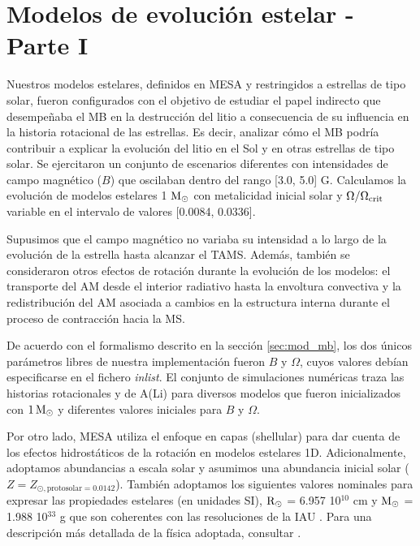 \section{Modelos de evolución estelar - Parte I} \label{evo_estelar_i}
Nuestros modelos estelares, definidos en MESA y restringidos a estrellas de tipo solar, fueron configurados con el objetivo de estudiar el papel indirecto que desempeñaba el MB en la destrucción del litio a consecuencia de su influencia en la historia rotacional de las estrellas. Es decir, analizar cómo el MB podría contribuir a explicar la evolución del litio en el Sol y en otras estrellas de tipo solar. Se ejercitaron un conjunto de escenarios diferentes con intensidades de campo magnético ($B$) que oscilaban dentro del rango [3.0, 5.0] G. Calculamos la evolución de modelos estelares  1 $\mathrm{M}_\odot$ con metalicidad inicial solar y $\Omega / \Omega_{\mathrm{crit}}$ variable en el intervalo de valores [0.0084, 0.0336].\par

Supusimos que el campo magnético no variaba su intensidad a lo largo de la evolución de la estrella hasta alcanzar el TAMS. Además, también se consideraron otros efectos de rotación durante la evolución de los modelos: el transporte del AM desde el interior radiativo hasta la envoltura convectiva y la redistribución del AM asociada a cambios en la estructura interna durante el proceso de contracción hacia la MS.\par

De acuerdo con el formalismo descrito en la sección \ref{sec:mod_mb}, los dos únicos parámetros libres de nuestra implementación fueron $B$ y $\Omega$, cuyos valores debían especificarse en el fichero \textit{inlist}. El conjunto de simulaciones numéricas traza las historias rotacionales y de A(Li) para diversos modelos que fueron inicializados con $1 \, \mathrm{M}_\odot$ y diferentes valores iniciales para $B$ y $\Omega$.\par 

Por otro lado, MESA utiliza el enfoque en capas (shellular) \citep{Meynet1997} para dar cuenta de los efectos hidrostáticos de la rotación en modelos estelares 1D. Adicionalmente, adoptamos abundancias a escala solar y asumimos una abundancia inicial solar ($Z = Z_{\odot, \mathrm{protosolar} = 0.0142}$). También adoptamos los siguientes valores nominales para expresar las propiedades estelares (en unidades SI), $\mathrm{R}_\odot$ = 6.957 10$^{10}$ cm y $\mathrm{M}_\odot$ = 1.988 10$^{33}$ g que son coherentes con las resoluciones de la IAU \citep{Mamajek2015}. Para una descripción más detallada de la física adoptada, consultar \cite{Choi2016}.\par

